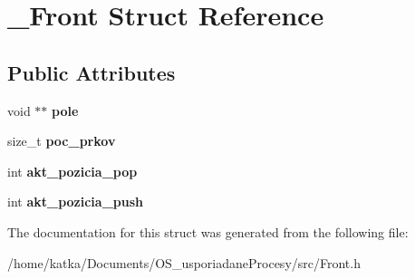 \hypertarget{struct__Front}{}\section{\+\_\+\+Front Struct Reference}
\label{struct__Front}
\subsection*{Public Attributes}
\begin{DoxyCompactItemize}
\item 
void $\ast$$\ast$ {\bfseries pole}\hypertarget{struct__Front_aaeb70caeedb19e72ba106f621e496942}{}\label{struct__Front_aaeb70caeedb19e72ba106f621e496942}

\item 
size\+\_\+t {\bfseries poc\+\_\+prkov}\hypertarget{struct__Front_a4eadefd147ef83ec0a5f855046ad192a}{}\label{struct__Front_a4eadefd147ef83ec0a5f855046ad192a}

\item 
int {\bfseries akt\+\_\+pozicia\+\_\+pop}\hypertarget{struct__Front_ab755728649fe43c6e3c394ed168387d7}{}\label{struct__Front_ab755728649fe43c6e3c394ed168387d7}

\item 
int {\bfseries akt\+\_\+pozicia\+\_\+push}\hypertarget{struct__Front_a0931c8786584f8671ec4b7c42ba2bdee}{}\label{struct__Front_a0931c8786584f8671ec4b7c42ba2bdee}

\end{DoxyCompactItemize}


The documentation for this struct was generated from the following file\+:\begin{DoxyCompactItemize}
\item 
/home/katka/\+Documents/\+O\+S\+\_\+usporiadane\+Procesy/src/Front.\+h\end{DoxyCompactItemize}
